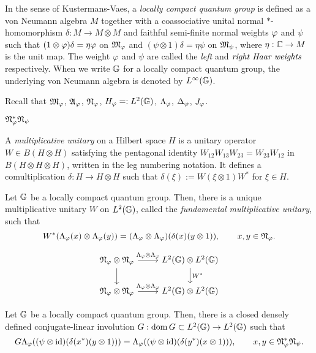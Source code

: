 \documentclass{../../large}
\begin{document}
\begin{prb}
In the sense of Kustermans-Vaes, a \emph{locally compact quantum group} is defined as a von Neumann algebra $M$ together with a coassociative unital normal $*$-homomorphism $\delta:M\to M\bar\otimes M$ and faithful semi-finite normal weights $\varphi$ and $\psi$ such that $(1\otimes\varphi)\delta=\eta\varphi$ on $\mathfrak{M}_\varphi$ and $(\psi\otimes1)\delta=\eta\psi$ on $\mathfrak{M}_\psi$, where $\eta:\mathbb{C}\to M$ is the unit map.
The weight $\varphi$ and $\psi$ are called the \emph{left} and $\emph{right Haar weights}$ respectively.
When we write $\mathbb{G}$ for a locally compact quantum group, the underlying von Neumann algebra is denoted by $L^\infty(\mathbb{G})$.

Recall that $\mathfrak{M}_\varphi$, $\mathfrak{A}_\varphi$, $\mathfrak{N}_\varphi$, $H_\varphi=:L^2(\mathbb{G})$, $\Lambda_\varphi$, $\Delta_\varphi$, $J_\varphi$.

$\mathfrak{N}_\varphi^*\mathfrak{N}_\psi$
\end{prb}




\begin{prb}
A \emph{multiplicative unitary} on a Hilbert space $H$ is a unitary operator $W\in B(H\otimes H)$ satisfying the pentagonal identity $W_{12}W_{13}W_{23}=W_{23}W_{12}$ in $B(H\otimes H\otimes H)$, written in the leg numbering notation.
It defines a comultiplication $\delta:H\to H\otimes H$ such that $\delta(\xi):=W(\xi\otimes1)W^*$ for $\xi\in H$.

Let $\mathbb{G}$ be a locally compact quantum group.
Then, there is a unique multiplicative unitary $W$ on $L^2(\mathbb{G})$, called the \emph{fundamental multiplicative unitary}, such that
\[W^*(\Lambda_\varphi(x)\otimes\Lambda_\varphi(y))=(\Lambda_\varphi\otimes\Lambda_\varphi)(\delta(x)(y\otimes1)),\qquad x,y\in\mathfrak{N}_\varphi.\]

\[\begin{tikzcd}
\fN_\f\otimes\fN_\f \rar{\Lambda_\f\otimes\Lambda_\f}\dar & L^2(\G)\otimes L^2(\G) \dar{W^*}\\
\fN_\f\otimes\fN_\f \rar{\Lambda_\f\otimes\Lambda_\f} & L^2(\G)\otimes L^2(\G)
\end{tikzcd}\]
\end{prb}


\begin{prb}
Let $\mathbb{G}$ be a locally compact quantum group.
Then, there is a closed densely defined conjugate-linear involution $G:\operatorname{dom} G\subset L^2(\mathbb{G})\to L^2(\mathbb{G})$ such that
\[G\Lambda_\varphi((\psi\otimes\operatorname{id})(\delta(x^*)(y\otimes1)))=\Lambda_\varphi((\psi\otimes\operatorname{id})(\delta(y^*)(x\otimes1))),\qquad x,y\in\mathfrak{N}_\varphi^*\mathfrak{N}_\psi.\]
\end{prb}
\end{document}
